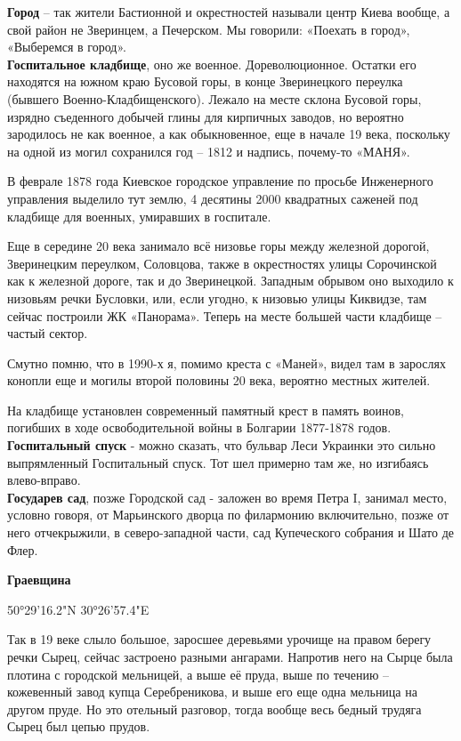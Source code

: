 
\textbf{Город} – так жители Бастионной и окрестностей называли центр Киева вообще, а свой район не Зверинцем, а Печерском. Мы говорили: «Поехать в город», «Выберемся в город».\\

\textbf{Госпитальное кладбище}, оно же военное. Дореволюционное. Остатки его находятся на южном краю Бусовой горы, в конце Зверинецкого переулка (бывшего Военно-Кладбищенско\-го). Лежало на месте склона Бусовой горы, изрядно съеденного добычей глины для кирпичных заводов, но вероятно зародилось не как военное, а как обыкновенное, еще в начале 19 века, поскольку на одной из могил сохранился год – 1812 и надпись, почему-то «МАНЯ».

В феврале 1878 года Киевское городское управление по просьбе Инженерного управления выделило тут землю, 4 десятины 2000 квадратных саженей под кладбище для военных, умиравших в госпитале. 

Еще в середине 20 века занимало всё низовье горы между железной дорогой, Зверинецким переулком, Соловцова, также в окрестностях улицы Сорочинской как к железной дороге, так и до Зверинецкой. Западным обрывом оно выходило к низовьям речки Бусловки, или, если угодно, к низовью улицы Киквидзе, там сейчас построили ЖК «Панорама». Теперь на месте большей части кладбище – частый сектор.

Смутно помню, что в 1990-х я, помимо креста с «Маней», видел там в зарослях конопли еще и могилы второй половины 20 века, вероятно местных жителей.

На кладбище установлен современный памятный крест в память воинов, погибших в ходе освободительной войны в Болгарии 1877-1878 годов.\\

\textbf{Госпитальный спуск} - можно сказать, что бульвар Леси Украинки это сильно выпрямленный Госпитальный спуск. Тот шел примерно там же, но изгибаясь влево-вправо.\\

\textbf{Государев сад}, позже Городской сад - заложен во время Петра I, занимал место, условно говоря, от Марьинского дворца по филармонию включительно, позже от него отчекрыжили, в северо-западной части, сад Купеческого собрания и Шато де Флер.

\textbf{Граевщина} 

50°29'16.2"N 30°26'57.4"E

Так в 19 веке слыло большое, заросшее деревьями урочище на правом берегу речки Сырец, сейчас застроено разными ангарами. Напротив него на Сырце была плотина с городской мельницей, а выше её пруда, выше по течению – кожевенный завод купца Серебреникова, и выше его еще одна мельница на другом пруде. Но это отельный разговор, тогда вообще весь бедный трудяга Сырец был цепью прудов.\\


